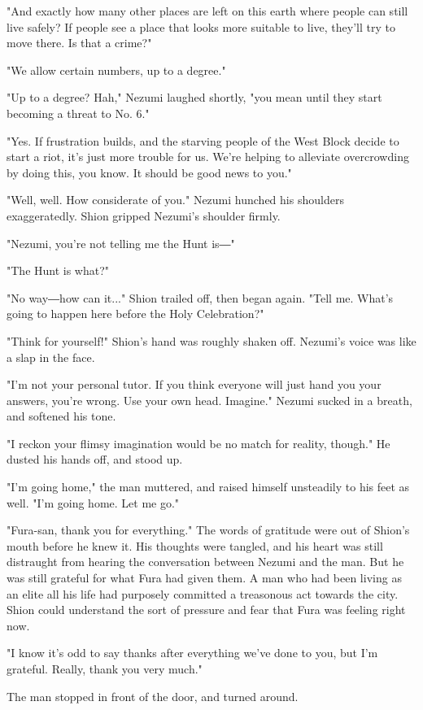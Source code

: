 "And exactly how many other places are left on this earth where people
can still live safely? If people see a place that looks more suitable to
live, they'll try to move there. Is that a crime?"

"We allow certain numbers, up to a degree."

"Up to a degree? Hah," Nezumi laughed shortly, "you mean until they
start becoming a threat to No. 6."

"Yes. If frustration builds, and the starving people of the West Block
decide to start a riot, it's just more trouble for us. We're helping to
alleviate overcrowding by doing this, you know. It should be good news
to you."

"Well, well. How considerate of you." Nezumi hunched his shoulders
exaggeratedly. Shion gripped Nezumi's shoulder firmly.

"Nezumi, you're not telling me the Hunt is―"

"The Hunt is what?"

"No way―how can it..." Shion trailed off, then began again. "Tell me.
What's going to happen here before the Holy Celebration?"

"Think for yourself!" Shion's hand was roughly shaken off. Nezumi's
voice was like a slap in the face.

"I'm not your personal tutor. If you think everyone will just hand you
your answers, you're wrong. Use your own head. Imagine." Nezumi sucked
in a breath, and softened his tone.

"I reckon your flimsy imagination would be no match for reality,
though." He dusted his hands off, and stood up.

"I'm going home," the man muttered, and raised himself unsteadily to his
feet as well. "I'm going home. Let me go."

"Fura-san, thank you for everything." The words of gratitude were out of
Shion's mouth before he knew it. His thoughts were tangled, and his
heart was still distraught from hearing the conversation between Nezumi
and the man. But he was still grateful for what Fura had given them. A
man who had been living as an elite all his life had purposely committed
a treasonous act towards the city. Shion could understand the sort of
pressure and fear that Fura was feeling right now.

"I know it's odd to say thanks after everything we've done to you, but
I'm grateful. Really, thank you very much."

The man stopped in front of the door, and turned around.

